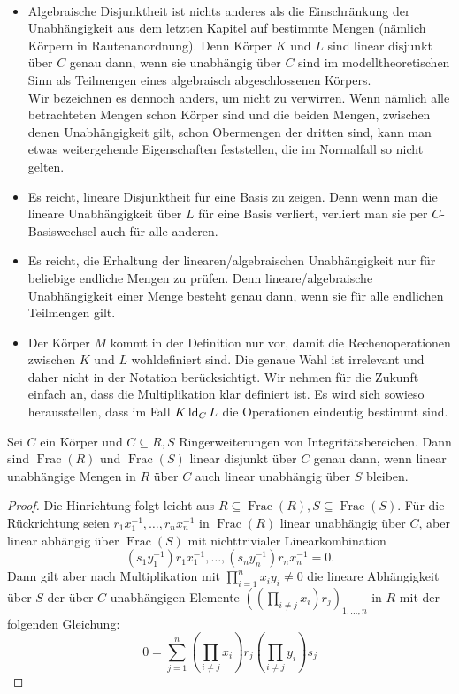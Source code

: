     \begin{remark}
    	\ 
    	\begin{itemize}
    		\item Algebraische Disjunktheit ist nichts anderes als die Einschränkung der Unabhängigkeit aus dem letzten Kapitel auf bestimmte Mengen (nämlich Körpern in Rautenanordnung). Denn Körper $K$ und $L$ sind linear disjunkt über $C$ genau dann, wenn sie unabhängig über $C$ sind im modelltheoretischen Sinn als Teilmengen eines algebraisch abgeschlossenen Körpers.\\
    		Wir bezeichnen es dennoch anders, um nicht zu verwirren. Wenn nämlich alle betrachteten Mengen schon Körper sind und die beiden Mengen, zwischen denen Unabhängigkeit gilt, schon Obermengen der dritten sind, kann man etwas weitergehende Eigenschaften feststellen, die im Normalfall so nicht gelten.
    		\item Es reicht, lineare Disjunktheit für eine Basis zu zeigen. Denn wenn man die lineare Unabhängigkeit über $L$ für eine Basis verliert, verliert man sie per $C$-Basiswechsel auch für alle anderen.
    		\item Es reicht, die Erhaltung der linearen/algebraischen Unabhängigkeit nur für beliebige endliche Mengen zu prüfen. Denn lineare/algebraische Unabhängigkeit einer Menge besteht genau dann, wenn sie für alle endlichen Teilmengen gilt.
    		\item Der Körper $M$ kommt in der Definition nur vor, damit die Rechenoperationen zwischen $K$ und $L$ wohldefiniert sind. Die genaue Wahl ist irrelevant und daher nicht in der Notation berücksichtigt. Wir nehmen für die Zukunft einfach an, dass die Multiplikation klar definiert ist. Es wird sich sowieso herausstellen, dass im Fall $K\operatorname{ld}_CL$ die Operationen eindeutig bestimmt sind.
    	\end{itemize}
    \end{remark}
    
    \begin{lemma}\label{Fraktionskörper}
    	Sei $C$ ein Körper und $C\subseteq R,S$ Ringerweiterungen von Integritätsbereichen. Dann sind $\operatorname{Frac}(R)$ und $\operatorname{Frac}(S)$ linear disjunkt über $C$ genau dann, wenn linear unabhängige Mengen in $R$ über $C$ auch linear unabhängig über $S$ bleiben.
    \end{lemma}
    \begin{proof}
    	Die Hinrichtung folgt leicht aus $R\subseteq\operatorname{Frac}(R),S\subseteq\operatorname{Frac}(S)$. Für die Rückrichtung seien $r_1x_1^{-1},\dots,r_nx_n^{-1}$ in $\operatorname{Frac}(R)$ linear unabhängig über $C$, aber linear abhängig über $\operatorname{Frac}(S)$ mit nichttrivialer Linearkombination $$(s_1y_1^{-1})r_1x_1^{-1},\dots,(s_ny_n^{-1})r_nx_n^{-1}=0.$$
    	Dann gilt aber nach Multiplikation mit $\prod\limits_{i=1}^nx_iy_i\neq0$ die lineare Abhängigkeit über $S$ der über $C$ unabhängigen Elemente $((\prod\limits_{i\neq j}x_i)r_j)_{1,\dots,n}$ in $R$ mit der folgenden Gleichung: $$0=\sum\limits_{j=1}^n(\prod\limits_{i\neq j}x_i)r_j(\prod\limits_{i\neq j}y_i)s_j$$
    \end{proof}
    
